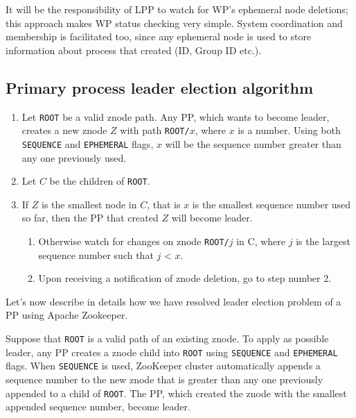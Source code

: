 \documentclass[sigchi]{acmart}
\begin{document}
It will be the responsibility of LPP to watch for WP's ephemeral node deletions; this approach makes WP status checking very simple. System coordination and membership is facilitated too, since any ephemeral node is used to store information about process that created (ID, Group ID etc.).


\subsection{Primary process leader election algorithm}

\begin{algorithm}
\caption{}\label{alg:leaderElection}
\begin{enumerate}

\item Let \texttt{ROOT} be a valid znode path. Any PP, which wants to become leader, creates a new znode $Z$ with path \texttt{ROOT/$x$}, where $x$ is a number. Using both \texttt{SEQUENCE} and \texttt{EPHEMERAL} flags, $x$ will be the sequence number greater than any one previously used.

\item Let $C$ be the children of \texttt{ROOT}. 

\item If $Z$ is the smallest node in $C$, that is $x$ is the smallest sequence number used so far, then the PP that created $Z$ will become leader.

\begin{enumerate}

\item Otherwise watch for changes on znode \texttt{ROOT/$j$} in C, where $j$ is the largest sequence number such that $j$ < $x$.

\item Upon receiving a notification of znode deletion, go to step number 2. 

\end{enumerate}
\end{enumerate}
\end{algorithm}

Let's now describe in details how we have resolved leader election problem of a PP using Apache Zookeeper.

Suppose that \texttt{ROOT} is a valid path of an existing znode. To apply as possible leader, any PP creates a znode child into \texttt{ROOT} using \texttt{SEQUENCE} and \texttt{EPHEMERAL} flags. When \texttt{SEQUENCE} is used, ZooKeeper cluster automatically appends a sequence number to the new znode that is greater than any one previously appended to a child of \texttt{ROOT}. The PP, which created the znode with the smallest appended sequence number, become leader.
\end{document}
